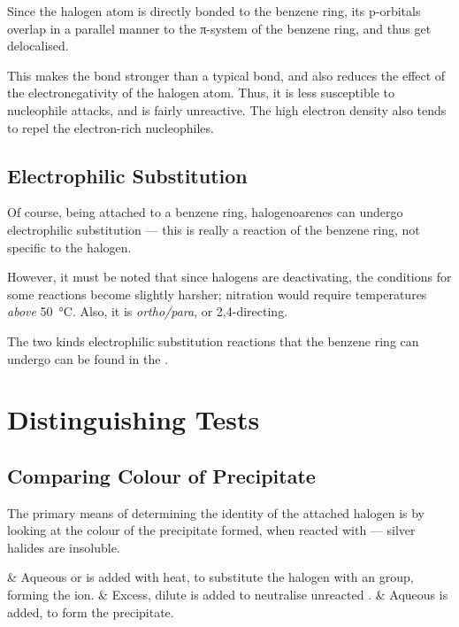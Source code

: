 		Since the halogen atom is directly bonded to the benzene ring, its p-orbitals overlap in a parallel manner to the π-system of the
		benzene ring, and thus get delocalised.


		This makes the bond stronger than a typical  bond, and also reduces the effect of the electronegativity of the halogen atom.
		Thus, it is less susceptible to nucleophile attacks, and is fairly unreactive. The high electron density also tends to repel the
		electron-rich nucleophiles.


		\subsection{Electrophilic Substitution}

			Of course, being attached to a benzene ring, halogenoarenes can undergo electrophilic substitution --- this is really a reaction
			of the benzene ring, not specific to the halogen.

			However, it must be noted that since halogens are deactivating, the conditions for some reactions become slightly harsher;
			nitration would require temperatures \textit{above} \SI{50}{\celsius}. Also, it is \textit{ortho/para}, or 2,4-directing.

			The two kinds electrophilic substitution reactions that the benzene ring can undergo can be found in the
			\hyperlink{AreneReactions}{}.



	\pagebreak
	\section{Distinguishing Tests}

		\subsection{Comparing Colour of Precipitate}
			The primary means of determining the identity of the attached halogen is by looking at the colour of the precipitate formed, when
			reacted with  --- silver halides are insoluble.

			\begin{numberedlist}
				&	Aqueous  or  is added with heat, to substitute the halogen with an  group, forming the  ion.
				&	Excess, dilute  is added to neutralise unreacted .
				&	Aqueous  is added, to form the  precipitate.
			\end{numberedlist}

